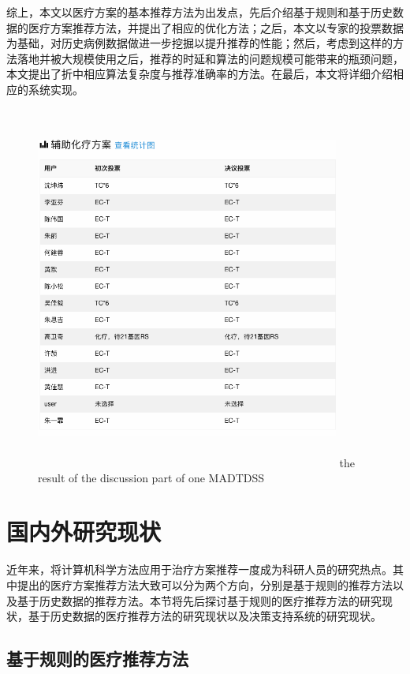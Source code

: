 综上，本文以医疗方案的基本推荐方法为出发点，先后介绍基于规则和基于历史数据的医疗方案推荐方法，并提出了相应的优化方法；之后，本文以专家的投票数据为基础，对历史病例数据做进一步挖掘以提升推荐的性能；然后，考虑到这样的方法落地并被大规模使用之后，推荐的时延和算法的问题规模可能带来的瓶颈问题，本文提出了折中相应算法复杂度与推荐准确率的方法。在最后，本文将详细介绍相应的系统实现。
\begin{figure}[!htp]
  \centering
  \includegraphics[width=10cm,height=12cm]{figure/ch1-fig1.png}
    {the result of the discussion part of one MADTDSS}
  \label{fig:ch1-1}
\end{figure}

\section{国内外研究现状}

近年来，将计算机科学方法应用于治疗方案推荐一度成为科研人员的研究热点。其中提出的医疗方案推荐方法大致可以分为两个方向，分别是基于规则的推荐方法以及基于历史数据的推荐方法。本节将先后探讨基于规则的医疗推荐方法的研究现状，基于历史数据的医疗推荐方法的研究现状以及决策支持系统的研究现状。

\subsection{基于规则的医疗推荐方法}

